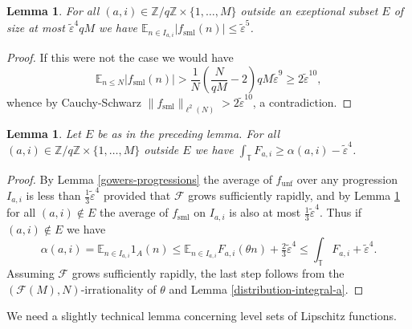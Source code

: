 \documentclass[10pt,reqno]{amsart}
\newtheorem{lemma}[theorem]{Lemma}
\theoremstyle{definition}
\theoremstyle{remark}
\newcommand{\mdsublem}[1]{\ensuremath{(\mbox{\scriptsize \textup{mod}}\, #1)}}
\renewcommand{\leq}{\leqslant}
\renewcommand{\geq}{\geqslant}
\newcommand\sml{\operatorname{sml}}
\newcommand\unf{\operatorname{unf}}
\def\Z{\mathbb{Z}}
\def\E{\mathbb{E}}
\def\T{\mathbb{T}}
\def\eps{\varepsilon}
\numberwithin{equation}{section}
\begin{document}
\begin{lemma}\label{setE}
For all $(a,i)\in\Z/q\Z\times\{1,\dots,M\}$ outside an exeptional subset $E$ of size at most ${\tilde\eps}^4 qM$ we have
$\E_{n\in I_{a,i}} |f_{\sml}(n)| \leq {\tilde\eps}^5$.
\end{lemma}
\begin{proof}
If this were not the case we would have \[\E_{n\leq N} |f_{\sml}(n)| > \frac{1}{N}\left(\frac{N}{qM} - 2\right) qM{\tilde\eps}^9 \geq 2{\tilde\eps}^{10},\] whence by Cauchy-Schwarz $\|f_{\sml}\|_{\ell^2(N)} > 2{\tilde\eps}^{10}$, a contradiction.
\end{proof}

\begin{lemma}\label{lem0.5}
Let $E$ be as in the preceding lemma. For all $(a,i)\in\Z/q\Z\times\{1,\dots,M\}$ outside $E$ we have $\int_{\T} F_{a,i} \geq \alpha(a,i) - {\tilde\eps}^4$. %
\end{lemma}
\begin{proof}
By Lemma \ref{gowers-progressions} the average of $f_{\unf}$ over any progression $I_{a,i}$ is less than $\tfrac{1}{3}{\tilde\eps}^4$ provided that $\mathcal{F}$ grows sufficiently rapidly, and by Lemma \ref{setE} for all $(a,i)\notin E$ the average of $f_{\sml}$ on $I_{a,i}$ is also at most $\tfrac{1}{3}{\tilde\eps}^4$. Thus if $(a,i)\notin E$ we have
\[ \alpha(a,i) = \E_{n \in I_{a,i}} 1_A(n) \leq \E_{n \in I_{a,i}} F_{a,i}(\theta n) + \tfrac{2}{3}{\tilde\eps}^4  \leq \int_{\T} F_{a,i} + {\tilde\eps}^4.\]
Assuming $\mathcal{F}$ grows sufficiently rapidly, the last step follows from the $(\mathcal{F}(M),N)$-irrationality of $\theta$ and Lemma \ref{distribution-integral-a}. 
 \end{proof}

We need a slightly technical lemma concerning level sets of Lipschitz functions.
\end{document}
